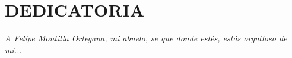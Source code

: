 \chapter*{DEDICATORIA}
\begin{flushright}
\textit{A Felipe Montilla Ortegana, mi abuelo, se que donde estés, estás orgulloso de mi...}
\end{flushright}
